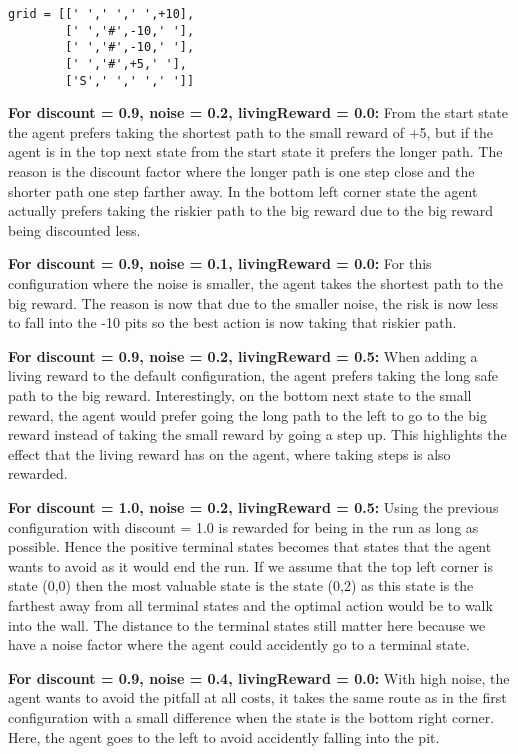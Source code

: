 \documentclass[11pt]{article}
\begin{document}
\begin{verbatim}
grid = [[' ',' ',' ',+10],
        [' ','#',-10,' '],
        [' ','#',-10,' '],
        [' ','#',+5,' '],
        ['S',' ',' ',' ']]
\end{verbatim}

\noindent \textbf{For discount = 0.9, noise = 0.2, livingReward = 0.0:} From the start state the agent prefers taking the shortest path to the small reward of +5, but if the agent is in the top next state from the start state it prefers the longer path. The reason is the discount factor where the longer path is one step close and the shorter path one step farther away. In the bottom left corner state the agent actually prefers taking the riskier path to the big reward due to the big reward being discounted
less.

\noindent 
\textbf{For discount = 0.9, noise = 0.1, livingReward = 0.0:} For this configuration where the noise is smaller, the agent takes the shortest path to the big reward. The reason is now that due to the smaller noise, the risk is now less to fall into the -10 pits so the best action is now taking that riskier path.

\noindent
\textbf{For discount = 0.9, noise = 0.2, livingReward = 0.5:} When adding a living reward to the default configuration, the agent prefers taking the long safe path to the big reward. Interestingly, on the bottom next state to the small reward, the agent would prefer going the long path to the left to go to the big reward instead of taking the small reward by going a step up. This highlights the effect that the living reward has on the agent, where taking steps is also rewarded.

\noindent
\textbf{For discount = 1.0, noise = 0.2, livingReward = 0.5:} Using the previous configuration with discount = 1.0 is rewarded for being in the run as long as possible. Hence the positive terminal states becomes that states that the agent wants to avoid as it would end the run. If we assume that the top left corner is state (0,0) then the most valuable state is the state (0,2) as this state is the farthest away from all terminal states and the optimal action would be to walk into the wall. The distance to the terminal states still matter here because we have a noise factor where the agent could accidently go to a terminal state.

\noindent
\textbf{For discount = 0.9, noise = 0.4, livingReward = 0.0:} With high noise, the agent wants to avoid the pitfall at all costs, it takes the same route as in the first configuration with a small difference when the state is the bottom right corner. Here, the agent goes to the left to avoid accidently falling into the pit.
\end{document}

